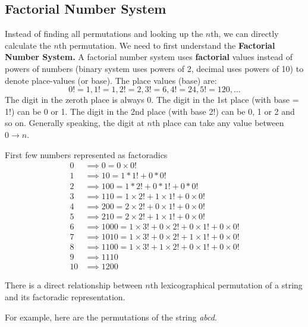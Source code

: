 \subsection{Factorial Number System}
Instead of finding all permutations and looking up the $n$th, we can directly calculate the $n$th permutation. We need to first understand the \textbf{Factorial Number System.} A factorial number system uses \textbf{factorial} values instead of powers of numbers (binary system uses powers of 2, decimal uses powers of 10) to denote place-values (or base). The place values (base) are:
\[
0!=1, 1!=1, 2!=2, 3!=6, 4!=24, 5!=120, \ldots
\]
The digit in the zeroth place is always 0. The digit in the 1st place (with base = 1!) can be 0 or 1. The digit in the 2nd place (with base 2!) can be 0, 1 or 2 and so on. Generally speaking, the digit at $n$th place can take any value between $0\to n$.
\par
First few numbers represented as factoradics
\begin{align*}
    0 & \implies 0 = 0\times 0! \\
    1 & \implies 10 = 1*1! + 0*0! \\
    2 & \implies 100 = 1*2! + 0*1! + 0*0! \\
    3 & \implies 110 = 1\times 2! + 1\times 1! + 0\times 0! \\
    4 & \implies 200 = 2\times 2! + 0\times 1! + 0\times 0! \\
    5 & \implies 210 = 2\times 2! + 1\times 1! + 0\times 0! \\
    6 & \implies 1000 = 1\times 3! + 0\times 2! + 0\times 1! + 0\times 0! \\
    7 & \implies 1010 = 1\times 3! + 0\times 2! + 1\times 1! + 0\times 0! \\
    8 & \implies 1100 = 1\times 3! + 1\times 2! + 0\times 1! + 0\times 0! \\
    9 & \implies 1110 \\
    10& \implies 1200
\end{align*}
\par
There is a direct relationship between $n$th lexicographical permutation of a string and its factoradic representation.
\par
For example, here are the permutations of the string \textit{abcd}.
\begin{figure} [H]
    \centering
\end{figure}
